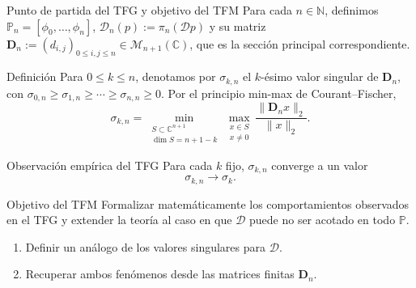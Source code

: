 \documentclass[aspectratio=169,10pt]{beamer}
\newcommand{\C}{\mathbb{C}}
\newcommand{\Poly}{\mathbb{P}}
\newcommand{\D}{\mathcal{D}}
\begin{document}
\begin{frame}{Punto de partida del TFG y objetivo del TFM}
  \scriptsize
  \setlength{\abovedisplayskip}{1.5pt}
  \setlength{\belowdisplayskip}{1.5pt}
  \setlength{\abovedisplayshortskip}{0.8pt}
  \setlength{\belowdisplayshortskip}{0.8pt}
  Para cada \(n\in\mathbb N\), definimos \(\mathbb P_n=[\phi_0,\dots,\phi_n]\),
  \(\mathcal D_n(p):=\pi_n(\D p)\) y su matriz
  \(\mathbf D_n:=(d_{i,j})_{0\le i,j\le n}\in\mathcal M_{n+1}(\C)\), que es la sección principal correspondiente.

  \begin{block}{Definición}
    Para \(0\le k\le n\), denotamos por \(\sigma_{k,n}\) el \(k\)-ésimo valor singular
    de \(\mathbf D_n\), con \(\sigma_{0,n}\ge\sigma_{1,n}\ge\cdots\ge\sigma_{n,n}\ge0\).
    Por el principio min-max de Courant--Fischer,
    \[
      \sigma_{k,n}
      =
      \min_{\substack{S\subset\C^{n+1}\\ \dim S=n+1-k}}
      \max_{\substack{x\in S\\ x\neq0}}
      \frac{\|\mathbf D_nx\|_2}{\|x\|_2}.
    \]
  \end{block}

  \vspace{-1mm}
  {
    \begin{alertblock}{Observación empírica del TFG}
      Para cada \(k\) fijo, \(\sigma_{k,n}\) converge a un valor
      \[
        \sigma_{k,n}\longrightarrow \sigma_k.
      \]
    \end{alertblock}}

  \vspace{-1mm}
  \begin{block}{Objetivo del TFM}
    Formalizar matemáticamente los comportamientos observados en el TFG y extender la teoría al caso en que \(\D\) puede no ser acotado en todo \(\Poly\).
    \begin{enumerate}
      \item Definir un análogo de los valores singulares para \(\D\).
      \item Recuperar ambos fenómenos desde las matrices finitas \(\mathbf D_n\).
    \end{enumerate}
  \end{block}
\end{frame}
\end{document}
